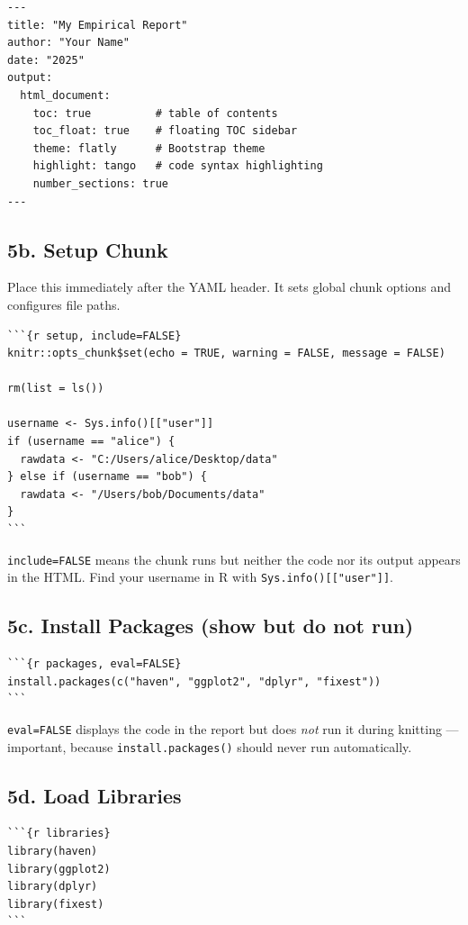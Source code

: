 \documentclass[paper=a4, fontsize=11pt]{scrartcl}
\begin{document}
\begin{lstlisting}[style=yaml]
---
title: "My Empirical Report"
author: "Your Name"
date: "2025"
output:
  html_document:
    toc: true          # table of contents
    toc_float: true    # floating TOC sidebar
    theme: flatly      # Bootstrap theme
    highlight: tango   # code syntax highlighting
    number_sections: true
---
\end{lstlisting}

\subsection*{5b. Setup Chunk}

Place this immediately after the YAML header.
It sets global chunk options and configures file paths.

\begin{lstlisting}[style=rcode]
```{r setup, include=FALSE}
knitr::opts_chunk$set(echo = TRUE, warning = FALSE, message = FALSE)

rm(list = ls())

username <- Sys.info()[["user"]]
if (username == "alice") {
  rawdata <- "C:/Users/alice/Desktop/data"
} else if (username == "bob") {
  rawdata <- "/Users/bob/Documents/data"
}
```
\end{lstlisting}

\texttt{include=FALSE} means the chunk runs but neither the code nor its output
appears in the HTML. Find your username in R with \texttt{Sys.info()[["user"]]}.

\subsection*{5c. Install Packages (show but do not run)}

\begin{lstlisting}[style=rcode]
```{r packages, eval=FALSE}
install.packages(c("haven", "ggplot2", "dplyr", "fixest"))
```
\end{lstlisting}

\texttt{eval=FALSE} displays the code in the report but does \textit{not} run it
during knitting --- important, because \texttt{install.packages()} should never run
automatically.

\subsection*{5d. Load Libraries}

\begin{lstlisting}[style=rcode]
```{r libraries}
library(haven)
library(ggplot2)
library(dplyr)
library(fixest)
```
\end{lstlisting}
\end{document}
